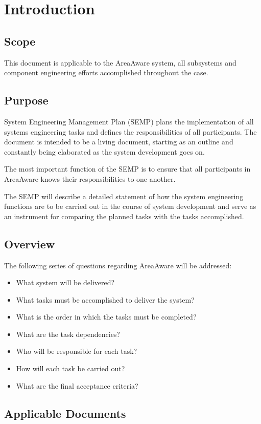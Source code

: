 %
\thispagestyle{fancy}
\chapter{Introduction}
\label{chp:intro}


\section{Scope}
This document is applicable to the AreaAware system, all subsystems and component engineering efforts accomplished throughout the case.

\section{Purpose}
System Engineering Management Plan (SEMP) plans the implementation of all systems engineering tasks and defines the responsibilities of all participants.
The document is intended to be a living document, starting as an outline and constantly being elaborated as the system development goes on.

The most important function of the SEMP is to ensure that all participants in AreaAware knows their responsibilities to one another. 

The SEMP will describe a detailed statement of how the system engineering functions are to be carried out in the course of system development and serve as an instrument for comparing the planned tasks with the tasks accomplished.

\section{Overview}
The following series of questions regarding AreaAware will be addressed:
\begin{itemize}
    \item What system will be delivered?
    \item What tasks must be accomplished to deliver the system?
    \item What is the order in which the tasks must be completed?
    \item What are the task dependencies?
    \item Who will be responsible for each task?
    \item How will each task be carried out?
    \item What are the final acceptance criteria?
\end{itemize}

\section{Applicable Documents}

